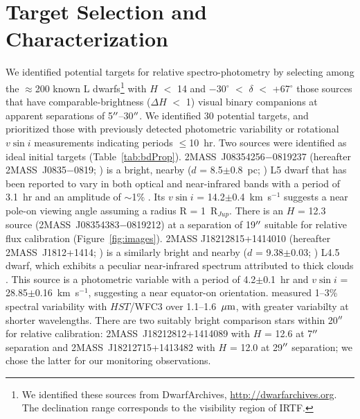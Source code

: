 \documentclass[twocolumn]{aastex6}
\newcommand{\degree}{$^\circ$}
\newcommand{\kms}{km~s$^{-1}$}
\newcommand{\rjup}{R$_{Jup}$}
\newcommand{\sha}{2MASS~J0835$-$0819}
\newcommand{\shb}{2MASS~J1812+1414}
\begin{document}
\section{Target Selection and Characterization}\label{sec:targets}

We identified potential targets for relative spectro-photometry by selecting among the $\approx$200 known L dwarfs\footnote{We identified these sources from DwarfArchives,  \url{http://dwarfarchives.org}. The declination range corresponds to the visibility region of IRTF.} with $H$ $<$ 14 and $-$30{\degree}  $<$ $\delta$ $<$ +67{\degree} those sources that have comparable-brightness ($\Delta{H}$ $<$ 1) visual binary companions at apparent separations of 5$\mbox{$^{\prime\prime}$}$--30$\mbox{$^{\prime\prime}$}$. We identified 30 potential targets, and prioritized those with previously detected photometric variability or rotational $v\sin{i}$ measurements indicating periods $\leq$10~hr.  Two sources were identified as ideal initial targets (Table~\ref{tab:bdProp}).
2MASS~J08354256$-$0819237 (hereafter {\sha}; \citealt{2003AJ....126.2421C}) is a bright, nearby ($d$ = 8.5$\pm$0.8~pc; \citealt{2012ApJ...752...56F}) L5 dwarf that has been reported to vary in both optical and near-infrared bands with a period of 3.1~hr and an amplitude of $\sim$1\%  \citep{2004MNRAS.354..378K,2014A&A...566A.111W}. Its $v\sin{i}$ = 14.2$\pm$0.4~{\kms} \citep{2010ApJ...723..684B} suggests a near pole-on viewing angle assuming a radius R = 1~{\rjup}. There is an $H$ = 12.3 source (2MASS~J08354383$-$0819212) at a separation of 19$\mbox{$^{\prime\prime}$}$ suitable for relative flux calibration (Figure~\ref{fig:images}). 
2MASS J18212815+1414010 (hereafter {\shb}; \citealt{2008ApJ...686..528L}) is a similarly bright and nearby ($d$ = 9.38$\pm$0.03; \citealt{2016MNRAS.455..357S}) L4.5 dwarf, which exhibits a peculiar near-infrared spectrum attributed to thick clouds \citep{2008ApJ...686..528L,2015ApJS..219...33G}. This source is a photometric variable with a period of 4.2$\pm$0.1~hr \citep{2015ApJ...799..154M} and $v\sin{i}$ = 28.85$\pm$0.16~{\kms}, suggesting a near equator-on orientation.  \citet{2015ApJ...798L..13Y} measured 1--3\% spectral variability with $HST$/WFC3 over 1.1--1.6~$\mbox{$\mu$m}$, with greater variabilty at shorter wavelengths. There are two suitably bright comparison stars within 20$\mbox{$^{\prime\prime}$}$ for relative calibration: 2MASS~J18212812+1414089 with $H$ = 12.6 at 7$\mbox{$^{\prime\prime}$}$ separation and 2MASS~J18212715+1413482 with $H$ = 12.0 at 29$\mbox{$^{\prime\prime}$}$ separation; we chose the latter for our monitoring observations.
\end{document}
